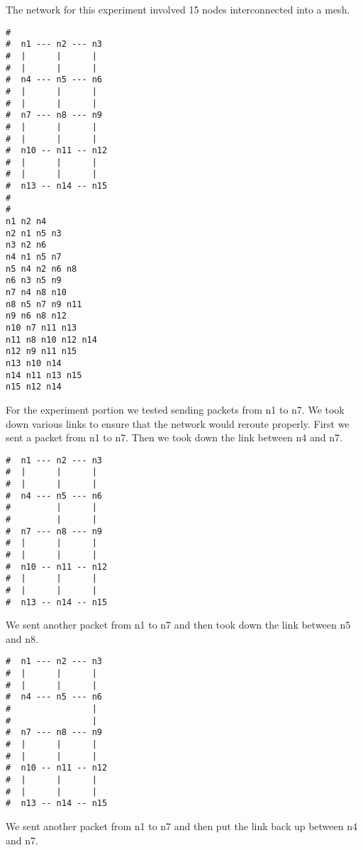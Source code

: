\documentclass[11pt]{article}
\begin{document}
The network for this experiment involved 15 nodes interconnected into a mesh.

\vspace{5mm}

\begin{lstlisting}
#
#  n1 --- n2 --- n3
#  |      |      |
#  |      |      |
#  n4 --- n5 --- n6
#  |      |      |
#  |      |      |
#  n7 --- n8 --- n9
#  |      |      |
#  |      |      |
#  n10 -- n11 -- n12
#  |      |      |
#  |      |      |
#  n13 -- n14 -- n15
#
# 
n1 n2 n4
n2 n1 n5 n3
n3 n2 n6
n4 n1 n5 n7
n5 n4 n2 n6 n8
n6 n3 n5 n9
n7 n4 n8 n10
n8 n5 n7 n9 n11
n9 n6 n8 n12
n10 n7 n11 n13
n11 n8 n10 n12 n14
n12 n9 n11 n15
n13 n10 n14
n14 n11 n13 n15
n15 n12 n14
\end{lstlisting}

\vspace{5mm}

For the experiment portion we tested sending packets from n1 to n7. We took down various links to ensure that the network would reroute properly. First we sent a packet from n1 to n7. Then we took down the link between n4 and n7.

\vspace{5mm}

\begin{lstlisting}
#  n1 --- n2 --- n3
#  |      |      |
#  |      |      |
#  n4 --- n5 --- n6
#         |      |
#         |      |
#  n7 --- n8 --- n9
#  |      |      |
#  |      |      |
#  n10 -- n11 -- n12
#  |      |      |
#  |      |      |
#  n13 -- n14 -- n15
\end{lstlisting}

\vspace{5mm}

We sent another packet from n1 to n7 and then took down the link between n5 and n8.

\vspace{5mm}

\begin{lstlisting}
#  n1 --- n2 --- n3
#  |      |      |
#  |      |      |
#  n4 --- n5 --- n6
#                |
#                |
#  n7 --- n8 --- n9
#  |      |      |
#  |      |      |
#  n10 -- n11 -- n12
#  |      |      |
#  |      |      |
#  n13 -- n14 -- n15
\end{lstlisting}

\vspace{5mm}

We sent another packet from n1 to n7 and then put the link back up between n4 and n7.
\end{document}
